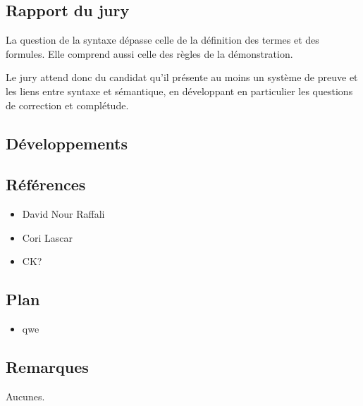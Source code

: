 \documentclass[../../agregation.tex]{subfiles}
\begin{document}

\subsection{Rapport du jury}

\begin{aquote}{}
La question de la syntaxe dépasse celle de la définition des termes et des formules. Elle comprend aussi celle des règles de la démonstration.

Le jury attend donc du candidat qu'il présente au moins un système de preuve et les liens entre syntaxe et sémantique, en développant en particulier les questions de correction et complétude.
\end{aquote}

\subsection{Développements}

\dvts

\subsection{Références}

\begin{itemize}
	\item David Nour Raffali
	\item Cori Lascar
	\item CK?
\end{itemize}

\subsection{Plan}

\begin{itemize}
	\item qwe
\end{itemize}

\subsection{Remarques}

Aucunes.
\end{document}
